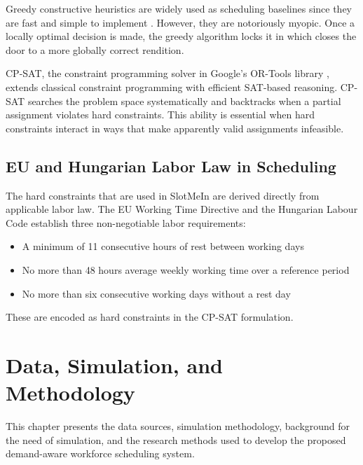 \documentclass[12pt,a4paper,oneside]{article}
\begin{document}
Greedy constructive heuristics are widely used as scheduling baselines since they are fast and simple to implement \citep{bergh2013}. However, they are notoriously myopic. Once a locally optimal decision is made, the greedy algorithm locks it in which closes the door to a more globally correct rendition.

CP-SAT, the constraint programming solver in Google's OR-Tools library \citep{ortools2024}, extends classical constraint programming with efficient SAT-based reasoning. CP-SAT searches the problem space systematically and backtracks when a partial assignment violates hard constraints. This ability is essential when hard constraints interact in ways that make apparently valid assignments infeasible.


\subsection{EU and Hungarian Labor Law in Scheduling}

The hard constraints that are used in SlotMeIn are derived directly from applicable labor law. The EU Working Time Directive \citep{wtd2003} and the Hungarian Labour Code \citep{hungarian2012} establish three non-negotiable labor requirements:

  \begin{itemize}
  \item A minimum of 11 consecutive hours of rest between working days
  \item No more than 48 hours average weekly working time over a reference period
  \item No more than six consecutive working days without a rest day
  \end{itemize}

These are encoded as hard constraints  in the CP-SAT formulation.

\newpage
\section{Data, Simulation, and Methodology}
\label{sec:data}

This chapter presents the data sources, simulation methodology, background for the need of simulation, and the research methods used to develop the proposed demand-aware workforce scheduling system.
\end{document}
